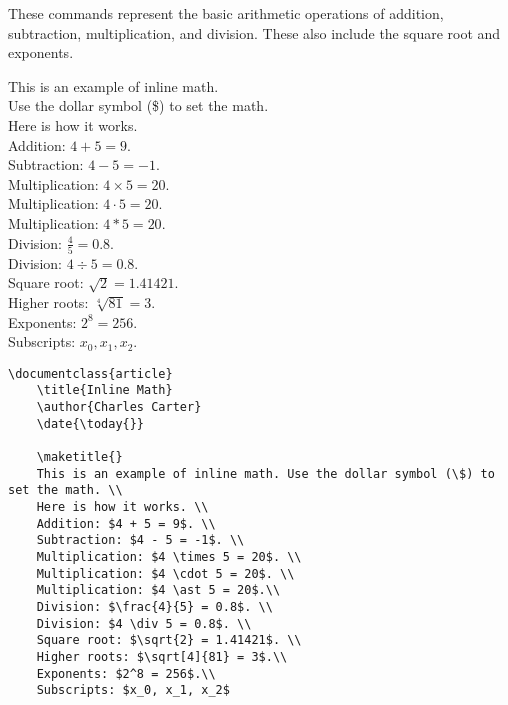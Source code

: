         These commands represent the basic arithmetic operations of addition, subtraction, multiplication, and division. These also include the square root and exponents.
        \begin{sample}
	This is an example of inline math.\\
Use the dollar symbol (\$) to set the math.\\
Here is how it works.\\
 Addition: $4 + 5 = 9$.\\
 Subtraction: $4 - 5 = -1$.\\
 Multiplication: $4 \times 5 = 20$.\\
Multiplication: $4 \cdot 5 = 20$.\\
 Multiplication: $4 \ast 5 = 20$.\\
 Division: $\frac{4}{5} = 0.8$.\\
 Division: $4 \div 5 = 0.8$.\\
 Square root: $\sqrt{2} = 1.41421$.\\
 Higher roots: $\sqrt[4]{81} = 3$.\\
 Exponents: $2^8 = 256$.\\
 Subscripts: $x_0, x_1, x_2$.
        \end{sample}

        \begin{verbatim}
\documentclass{article}
    \title{Inline Math}
    \author{Charles Carter}
    \date{\today{}}
 
    \maketitle{}
	This is an example of inline math. Use the dollar symbol (\$) to set the math. \\
	Here is how it works. \\
    Addition: $4 + 5 = 9$. \\
    Subtraction: $4 - 5 = -1$. \\
    Multiplication: $4 \times 5 = 20$. \\
    Multiplication: $4 \cdot 5 = 20$. \\
    Multiplication: $4 \ast 5 = 20$.\\
    Division: $\frac{4}{5} = 0.8$. \\
    Division: $4 \div 5 = 0.8$. \\
    Square root: $\sqrt{2} = 1.41421$. \\
    Higher roots: $\sqrt[4]{81} = 3$.\\
    Exponents: $2^8 = 256$.\\
	Subscripts: $x_0, x_1, x_2$
    
		\end{verbatim}

